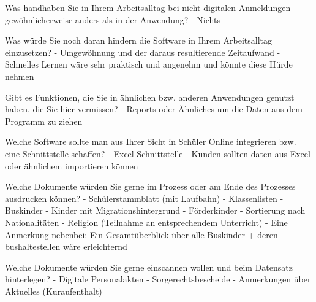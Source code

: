Was handhaben Sie in Ihrem Arbeitsalltag bei nicht-digitalen Anmeldungen gewöhnlicherweise anders als in der Anwendung?	
- Nichts



















Was würde Sie noch daran hindern die Software in Ihrem Arbeitsalltag einzusetzen?	
- Umgewöhnung und der daraus resultierende Zeitaufwand
- Schnelles Lernen wäre sehr praktisch und angenehm und könnte diese Hürde nehmen		
		
















Gibt es Funktionen, die Sie in ähnlichen bzw. anderen Anwendungen genutzt haben, die Sie hier vermissen?	 
- Reports oder Ähnliches um die Daten aus dem Programm zu ziehen	








Welche Software sollte man aus Ihrer Sicht in Schüler Online integrieren bzw. eine Schnittstelle schaffen? 
- Excel Schnittstelle
- Kunden sollten daten aus Excel oder ähnlichem importieren können	




Welche Dokumente würden Sie gerne im Prozess oder am Ende des Prozesses ausdrucken können?	
- Schülerstammblatt (mit Laufbahn)
- Klassenlisten 
- Buskinder
- Kinder mit Migrationshintergrund
- Förderkinder
- Sortierung nach Nationalitäten
- Religion (Teilnahme an entsprechendem Unterricht) 
- Eine Anmerkung nebenbei: Ein Gesamtüberblick über alle Buskinder + deren bushaltestellen wäre erleichternd

Welche Dokumente würden Sie gerne einscannen wollen und beim Datensatz hinterlegen?	
- Digitale Personalakten
- Sorgerechtsbescheide
- Anmerkungen über Aktuelles (Kuraufenthalt)	


